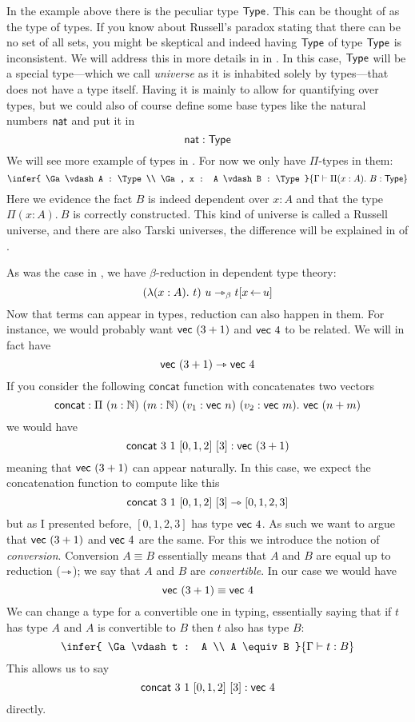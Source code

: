 
In the example above there is the peculiar type \(\mathsf{Type}\).
This can be thought of as the type of types. If you know about Russell's paradox
stating that there can be no set of all sets, you might be skeptical and indeed
having \(\mathsf{Type}\) of type \(\mathsf{Type}\) is inconsistent.
We will address this in more details in  in
.
In this case, \(\mathsf{Type}\) will be a special type---which we call \emph{universe}
as it is inhabited solely by types---that does not have a type itself.
Having it is mainly to allow for quantifying over types, but we could also of
course define some base types like the natural numbers \(\mathsf{nat}\) and put it in
\[
  \mathsf{nat} : \mathsf{Type}
\]
We will see more example of types in . For now we only have
\(\Pi\)-types in them:
\[
  \infer
    {
      \Ga \vdash A : \Type \\
      \Ga, x : A \vdash B : \Type
    }
    {\Ga \vdash \Pi (x:A).\ B : \Type}
\]
Here we evidence the fact \(B\) is indeed dependent over \(x : A\)
and that the type \(\Pi (x:A).\ B\) is correctly constructed.
This kind of universe is called a Russell universe, and there are also Tarski
universes, the difference will be explained in 
of .

As was the case in , we have \(\beta\)-reduction in
dependent type theory:
\[
  (\lambda (x:A).\ t)\ u \rightarrowtriangle_\beta t[x \mathop{\leftarrow} u]
\]
Now that terms can appear in types, reduction can also happen in them.
For instance, we would probably want \(\mathsf{vec}\ (3 + 1)\) and \(\mathsf{vec}\ 4\) to be
related. We will in fact have
\[
  \mathsf{vec}\ (3 + 1) \rightarrowtriangle \mathsf{vec}\ 4
\]
If you consider the following \(\mathsf{concat}\) function with concatenates
two vectors
\[
  \mathsf{concat} :
  \Pi\ (n : \mathbb{N})\ (m : \mathbb{N})\ (v_1 : \mathsf{vec}\ n)\ (v_2 : \mathsf{vec}\ m).\
  \mathsf{vec}\ (n + m)
\]
we would have
\[
  \mathsf{concat}\ 3\ 1\ [0,1,2]\ [3] : \mathsf{vec}\ (3 + 1)
\]
meaning that \(\mathsf{vec}\ (3 + 1)\) can appear naturally.
In this case, we expect the concatenation function to compute like this
\[
  \mathsf{concat}\ 3\ 1\ [0,1,2]\ [3] \rightarrowtriangle [0,1,2,3]
\]
but as I presented before, \([0,1,2,3]\) has type \(\mathsf{vec}\ 4\).
As such we want to argue that \(\mathsf{vec}\ (3 + 1)\) and \(\mathsf{vec}\ 4\) are the same.
For this we introduce the notion of \emph{conversion}.
Conversion \(A \equiv B\) essentially means that \(A\) and \(B\) are equal up
to reduction (\(\rightarrowtriangle\)); we say that \(A\) and \(B\) are \emph{convertible}.
In our case we would have
\[
  \mathsf{vec}\ (3 + 1) \equiv \mathsf{vec}\ 4
\]
We can change a type for a convertible one in typing, essentially saying that if
\(t\) has type \(A\) and \(A\) is convertible to \(B\) then \(t\) also has type
\(B\):
\[
  \infer
    {
      \Ga \vdash t : A \\
      A \equiv B
    }
    {\Ga \vdash t : B}
\]
This allows us to say
\[
  \mathsf{concat}\ 3\ 1\ [0,1,2]\ [3] : \mathsf{vec}\ 4
\]
directly.

